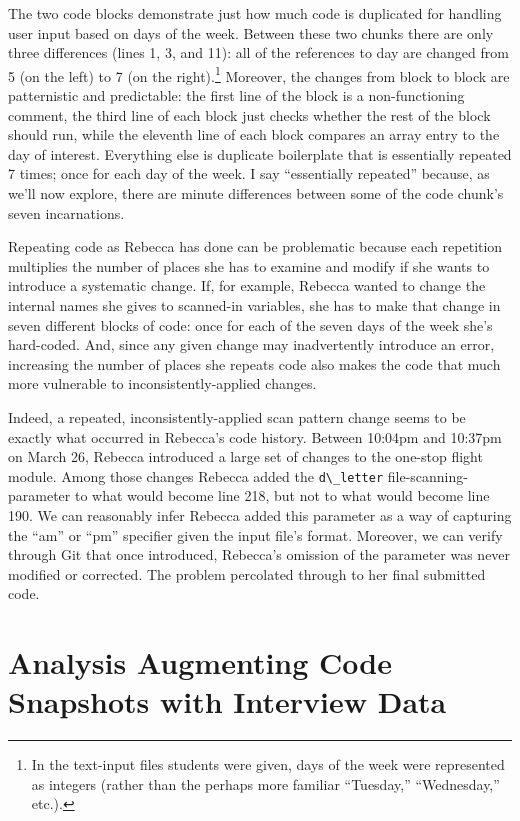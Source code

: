 The two code blocks demonstrate just how much code is duplicated for handling user input based on days of the week. Between these two chunks there are only three differences (lines 1, 3, and 11): all of the references to day are changed from 5 (on the left) to 7 (on the right).\footnote{In the text-input files students were given, days of the week were represented as integers (rather than the perhaps more familiar ``Tuesday,'' ``Wednesday,'' etc.).} Moreover, the changes from block to block are patternistic and predictable: the first line of the block is a non-functioning comment, the third line of each block just checks whether the rest of the block should run, while the eleventh line of each block compares an array entry to the day of interest. Everything else is duplicate boilerplate that is essentially repeated 7 times; once for each day of the week. I say ``essentially repeated'' because, as we'll now explore, there are minute differences between some of the code chunk's seven incarnations.

Repeating code as Rebecca has done can be problematic because each repetition multiplies the number of places she has to examine and modify if she wants to introduce a systematic change. If, for example, Rebecca wanted to change the internal names she gives to scanned-in variables, she has to make that change in seven different blocks of code: once for each of the seven days of the week she's hard-coded. And, since any given change may inadvertently introduce an error, increasing the number of places she repeats code also makes the code that much more vulnerable to inconsistently-applied changes.

Indeed, a repeated, inconsistently-applied scan pattern change seems to be exactly what occurred in Rebecca's code history. Between 10:04pm and 10:37pm on March 26, Rebecca introduced a large set of changes to the one-stop flight module. Among those changes Rebecca added the \texttt{d\textbackslash{}\_letter} file-scanning-parameter to what would become line 218, but not to what would become line 190. We can reasonably infer Rebecca added this parameter as a way of capturing the ``am'' or ``pm'' specifier given the input file's format. Moreover, we can verify through Git that once introduced, Rebecca's omission of the parameter was never modified or corrected. The problem percolated through to her final submitted code.

\section{Analysis Augmenting Code Snapshots with Interview Data}\label{analysis-augmenting-code-snapshots-with-interview-data}

